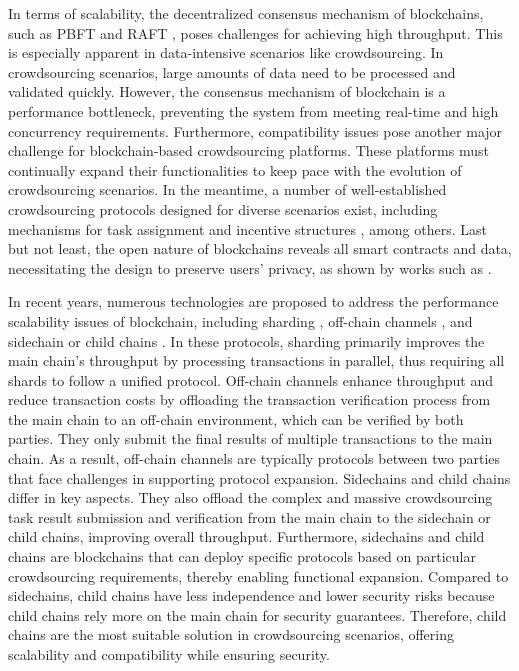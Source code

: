 \documentclass[10pt,journal]{IEEEtran}
\begin{document}
In terms of scalability, the decentralized consensus mechanism of blockchains, such as PBFT \cite{castro2002practical} and RAFT \cite{ongaro2014search}, poses challenges for achieving high throughput. This is especially apparent in data-intensive scenarios like crowdsourcing. In crowdsourcing scenarios, large amounts of data need to be processed and validated quickly. However, the consensus mechanism of blockchain is a performance bottleneck, preventing the system from meeting real-time and high concurrency requirements. Furthermore, compatibility issues pose another major challenge for blockchain-based crowdsourcing platforms. These platforms must continually expand their functionalities to keep pace with the evolution of crowdsourcing scenarios. In the meantime, a number of well-established crowdsourcing protocols designed for diverse scenarios exist, including mechanisms for task assignment \cite{zheng2015qasca, wang2017multi, bhatti2020approximation} and incentive structures \cite{zhang2014free, yang2015incentive, wang2020socialrecruiter}, among others. Last but not least, the open nature of blockchains reveals all smart contracts and data, necessitating the design to preserve users' privacy, as shown by works such as \cite{qiu2020location, yuan2019priradar,wang2019towards, zhang2021enabling, cai2019towards}.

In recent years, numerous technologies are proposed to address the performance scalability issues of blockchain, including sharding \cite{luu2016secure,li2024secure,li2025s3voting}, off-chain channels \cite{poon2016bitcoin,luo2024crosschannel}, and sidechain or child chains \cite{poon2017plasma}. In these protocols, sharding primarily improves the main chain's throughput by processing transactions in parallel, thus requiring all shards to follow a unified protocol. Off-chain channels enhance throughput and reduce transaction costs by offloading the transaction verification process from the main chain to an off-chain environment, which can be verified by both parties. They only submit the final results of multiple transactions to the main chain. As a result, off-chain channels are typically protocols between two parties that face challenges in supporting protocol expansion. Sidechains and child chains differ in key aspects. They also offload the complex and massive crowdsourcing task result submission and verification from the main chain to the sidechain or child chains, improving overall throughput. Furthermore, sidechains and child chains are blockchains that can deploy specific protocols based on particular crowdsourcing requirements, thereby enabling functional expansion. Compared to sidechains, child chains have less independence and lower security risks because child chains rely more on the main chain for security guarantees. Therefore, child chains are the most suitable solution in crowdsourcing scenarios, offering scalability and compatibility while ensuring security.
\end{document}
